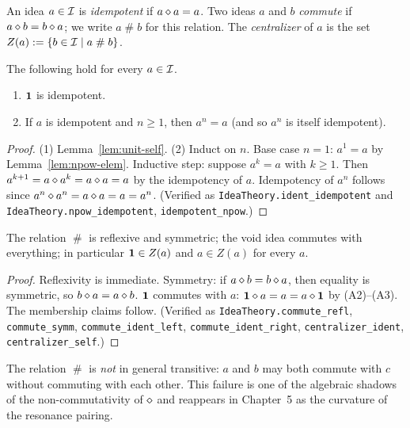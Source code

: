 \begin{definition}\label{def:idempotent}
An idea $a \in \mathcal{I}$ is \emph{idempotent} if $a \mathbin{\diamond} a = a$.  Two
ideas $a$ and $b$ \emph{commute} if $a \mathbin{\diamond} b = b \mathbin{\diamond} a$; we
write $a \mathrel{\#} b$ for this relation.  The \emph{centralizer} of $a$
is the set $Z(a) \mathrel{:=} \{ b \in \mathcal{I} \mid a \mathrel{\#} b \}$.
\end{definition}

\begin{lemma}\label{lem:idem-basic}
The following hold for every $a \in \mathcal{I}$.
\begin{enumerate}
\item $\mathbf{1}$ is idempotent.
\item If $a$ is idempotent and $n \ge 1$, then $a^n = a$ (and so $a^n$ is
itself idempotent).
\end{enumerate}
\end{lemma}

\begin{proof}
(1) Lemma~\ref{lem:unit-self}.  (2) Induct on $n$.  Base case $n = 1$:
$a^1 = a$ by Lemma~\ref{lem:npow-elem}.  Inductive step: suppose $a^k = a$
with $k \ge 1$.  Then $a^{k+1} = a \mathbin{\diamond} a^k = a \mathbin{\diamond} a = a$ by the
idempotency of $a$.  Idempotency of $a^n$ follows since $a^n \mathbin{\diamond} a^n
= a \mathbin{\diamond} a = a = a^n$.  (Verified as
\texttt{IdeaTheory.ident\_idempotent} and
\texttt{IdeaTheory.npow\_idempotent}, \texttt{idempotent\_npow}.)
\end{proof}

\begin{lemma}\label{lem:commute-basic}
The relation $\mathrel{\#}$ is reflexive and symmetric; the void idea
commutes with everything; in particular $\mathbf{1} \in Z(a)$ and $a \in Z(a)$
for every $a$.
\end{lemma}

\begin{proof}
Reflexivity is immediate.  Symmetry: if $a \mathbin{\diamond} b = b \mathbin{\diamond} a$,
then equality is symmetric, so $b \mathbin{\diamond} a = a \mathbin{\diamond} b$.
$\mathbf{1}$ commutes with $a$: $\mathbf{1} \mathbin{\diamond} a = a = a \mathbin{\diamond} \mathbf{1}$ by
(A2)--(A3).  The membership claims follow.  (Verified as
\texttt{IdeaTheory.commute\_refl}, \texttt{commute\_symm},
\texttt{commute\_ident\_left}, \texttt{commute\_ident\_right},
\texttt{centralizer\_ident}, \texttt{centralizer\_self}.)
\end{proof}

The relation $\mathrel{\#}$ is \emph{not} in general transitive: $a$ and
$b$ may both commute with $c$ without commuting with each other.  This
failure is one of the algebraic shadows of the non-commutativity of
$\mathbin{\diamond}$ and reappears in Chapter~5 as the curvature of the resonance
pairing.

